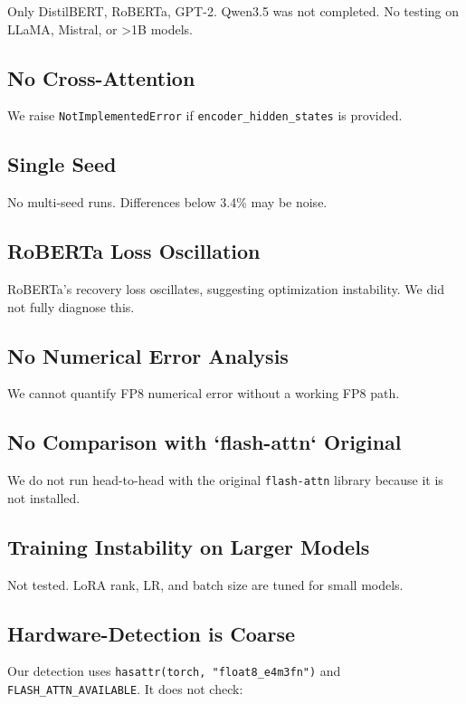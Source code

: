 Only DistilBERT, RoBERTa, GPT-2. Qwen3.5 was not completed. No testing on 
LLaMA, Mistral, or \textgreater{}1B models.

\subsection{No Cross-Attention}

We raise \texttt{NotImplementedError} if \texttt{encoder\_hidden\_states} is provided.

\subsection{Single Seed}

No multi-seed runs. Differences below 3.4\% may be noise.

\subsection{RoBERTa Loss Oscillation}

RoBERTa's recovery loss oscillates, suggesting optimization instability. 
We did not fully diagnose this.

\subsection{No Numerical Error Analysis}

We cannot quantify FP8 numerical error without a working FP8 path.

\subsection{No Comparison with `flash-attn` Original}

We do not run head-to-head with the original \texttt{flash-attn} library because 
it is not installed.

\subsection{Training Instability on Larger Models}

Not tested. LoRA rank, LR, and batch size are tuned for small models.

\subsection{Hardware-Detection is Coarse}

Our detection uses \texttt{hasattr(torch, "float8\_e4m3fn")} and 
\texttt{FLASH\_ATTN\_AVAILABLE}. It does not check:

